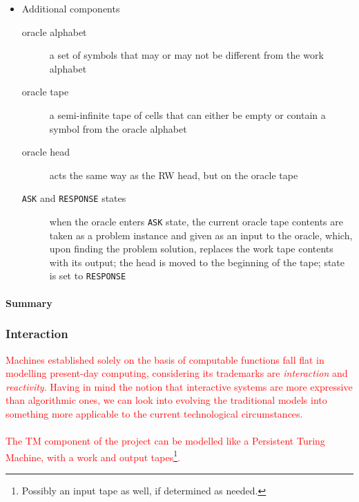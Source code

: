 \documentclass[12pt,a4,xcolor=table]{article}
\begin{document}
{\begin{multicols}{2}
\begin{itemize}
\begin{description}
				\item[control mechanism] responsible for performing actions such as moving the head, manipulating data and switching states\\\\\\
			\end{description}\columnbreak
			\item Additional components
			\begin{description}
				\item[oracle alphabet] a set of symbols that may or may not be different from the work alphabet
				\item[oracle tape] a semi-infinite tape of cells that can either be empty or contain a symbol from the oracle alphabet
				\item[oracle head] acts the same way as the RW head, but on the oracle tape
				\item[\texttt{ASK} and \texttt{RESPONSE} states] when the oracle enters \texttt{ASK} state, the current oracle tape contents are taken as a problem instance and given as an input to the oracle, which, upon finding the problem solution, replaces the work tape contents with its output; the head is moved to the beginning of the tape; state is set to \texttt{RESPONSE}
			\end{description}
		\end{itemize}
	\end{multicols}
	\paragraph{Summary}
	}	
	\subsubsection{Interaction}
	\textcolor{red}{
	Machines established solely on the basis of computable functions fall flat in modelling present-day computing, considering its trademarks are \textit{interaction} and \textit{reactivity}\cite{Goldin2004}. Having in mind the notion that interactive systems are more expressive than algorithmic ones\cite{Wegner1997}, we can look into evolving the traditional models into something more applicable to the current technological circumstances. \\\\
	The TM component of the project can be modelled like a Persistent Turing Machine, with a work and output tapes\footnote{Possibly an input tape as well, if determined as needed.}.
	}
\end{document}
